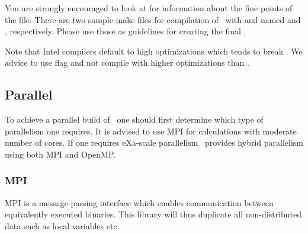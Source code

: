 You are strongly encouraged to look at
 for information about the
fine points of the  file. There are two sample make
files for compilation of \siesta\ with  and
 named  and
, respectively. Please use those as guidelines
for creating the final .

Note that Intel compilers default to high optimizations which tends to
break \siesta. We advice to use  flag and not
compile with higher optimizations than .

  



\subsection{Parallel}
\label{sec:parallel}

To achieve a parallel build of \siesta\ one should first determine
which type of parallelism one requires. It is advised to use MPI for
calculations with moderate number of cores. If one requires eXa-scale
parallelism \siesta\ provides hybrid parallelism using both MPI and
OpenMP. 


\subsubsection{MPI}

MPI is a message-passing interface which enables communication between
equivalently executed binaries. This library will thus duplicate all
non-distributed data such as local variables etc. 


